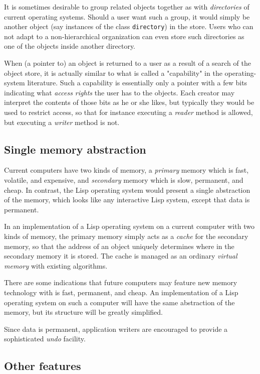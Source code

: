It is sometimes desirable to group related objects together as
with \emph{directories} of current operating systems.  Should a user
want such a group, it would simply be another object (say instances
of the class \texttt{directory}) in the store.  Users who can not
adapt to a non-hierarchical organization can even store such
directories as one of the objects inside another directory.

When (a pointer to) an object is returned to a user as a result of a
search of the object store, it is actually similar to what is called
a "capability" in the operating-system literature.  Such a
capability is essentially only a pointer with a few bits indicating
what \emph{access rights} the user has to the objects.  Each creator
may interpret the contents of those bits as he or she likes, but
typically they would be used to restrict access, so that for
instance executing a \emph{reader} method is allowed, but executing
a \emph{writer} method is not.

\subsection{Single memory abstraction}

Current computers have two kinds of memory, a \emph{primary} memory
which is fast, volatile, and expensive, and \emph{secondary} memory
which is slow, permanent, and cheap.  In contrast, the Lisp operating
system would present a single abstraction of the memory, which looks
like any interactive Lisp system, except that data is permanent.

In an implementation of a Lisp operating system on a current computer
with two kinds of memory, the primary memory simply acts as a
\emph{cache} for the secondary memory, so that the address of an
object uniquely determines where in the secondary memory it is stored.
The cache is managed as an ordinary \emph{virtual memory} with
existing algorithms.

There are some indications that future computers may feature new
memory technology with is fast, permanent, and cheap.  An
implementation of a Lisp operating system on such a computer will have
the same abstraction of the memory, but its structure will be greatly
simplified.

Since data is permanent, application writers are encouraged to
provide a sophisticated \emph{undo} facility.  

\subsection{Other features}

